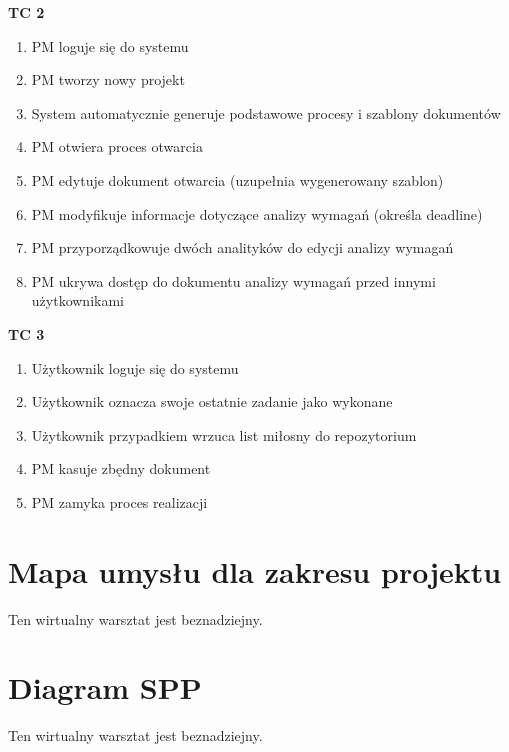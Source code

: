 \textbf{TC 2}
\begin{enumerate}
\item PM loguje się do systemu
\item PM tworzy nowy projekt
\item System automatycznie generuje podstawowe procesy i szablony dokumentów
\item PM otwiera proces otwarcia
\item PM edytuje dokument otwarcia (uzupełnia wygenerowany szablon)
\item PM modyfikuje informacje dotyczące analizy wymagań (określa deadline)
\item PM przyporządkowuje dwóch analityków do edycji analizy wymagań
\item PM ukrywa dostęp do dokumentu analizy wymagań przed innymi użytkownikami
\end{enumerate}


\textbf{TC 3}
\begin{enumerate}
\item Użytkownik loguje się do systemu
\item Użytkownik oznacza swoje ostatnie zadanie jako wykonane
\item Użytkownik przypadkiem wrzuca list miłosny do repozytorium
\item PM kasuje zbędny dokument
\item PM zamyka proces realizacji
\end{enumerate}




\section{Mapa umysłu dla zakresu projektu}

Ten wirtualny warsztat jest beznadziejny.


\section{Diagram SPP}

Ten wirtualny warsztat jest beznadziejny.


